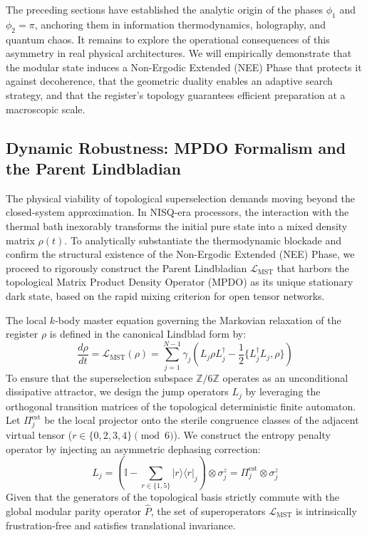 \documentclass[12pt,a4paper]{article}
\theoremstyle{plain}
\theoremstyle{definition}
\theoremstyle{remark}
\begin{document}
The preceding sections have established the analytic origin of the phases $\phi_1$ and $\phi_2 = \pi$, anchoring them in information thermodynamics, holography, and quantum chaos. It remains to explore the operational consequences of this asymmetry in real physical architectures. We will empirically demonstrate that the modular state induces a Non-Ergodic Extended (NEE) Phase that protects it against decoherence, that the geometric duality enables an adaptive search strategy, and that the register's topology guarantees efficient preparation at a macroscopic scale.

\subsection{Dynamic Robustness: MPDO Formalism and the Parent Lindbladian}
\label{subsec:robustez_dinamica}

The physical viability of topological superselection demands moving beyond the closed-system approximation. In NISQ-era processors, the interaction with the thermal bath inexorably transforms the initial pure state into a mixed density matrix $\rho(t)$. To analytically substantiate the thermodynamic blockade and confirm the structural existence of the Non-Ergodic Extended (NEE) Phase, we proceed to rigorously construct the Parent Lindbladian $\mathcal{L}_{\text{MST}}$ that harbors the topological Matrix Product Density Operator (MPDO) as its unique stationary dark state, based on the rapid mixing criterion for open tensor networks.

The local $k$-body master equation governing the Markovian relaxation of the register $\rho$ is defined in the canonical Lindblad form \cite{Lindblad1976} by:
\begin{equation}
\frac{d\rho}{dt} = \mathcal{L}_{\text{MST}}(\rho) = \sum_{j=1}^{N-1} \gamma_j \left( L_j \rho L_j^\dagger - \frac{1}{2} \{ L_j^\dagger L_j, \rho \} \right)
\label{eq:lindblad_master}
\end{equation}
To ensure that the superselection subspace $\mathbb{Z}/6\mathbb{Z}$ operates as an unconditional dissipative attractor, we design the jump operators $L_j$ by leveraging the orthogonal transition matrices of the topological deterministic finite automaton. Let $\Pi_j^{\text{est}}$ be the local projector onto the sterile congruence classes of the adjacent virtual tensor ($r \in \{0,2,3,4\} \pmod 6$). We construct the entropy penalty operator by injecting an asymmetric dephasing correction:
\begin{equation}
L_j = \left( \mathbb{I} - \sum_{r \in \{1,5\}} |r\rangle\langle r|_j \right) \otimes \sigma_j^z = \Pi_j^{\text{est}} \otimes \sigma_j^z
\label{eq:jump_operators}
\end{equation}
Given that the generators of the topological basis strictly commute with the global modular parity operator $\hat{P}$, the set of superoperators $\mathcal{L}_{\text{MST}}$ is intrinsically frustration-free and satisfies translational invariance.
\end{document}
